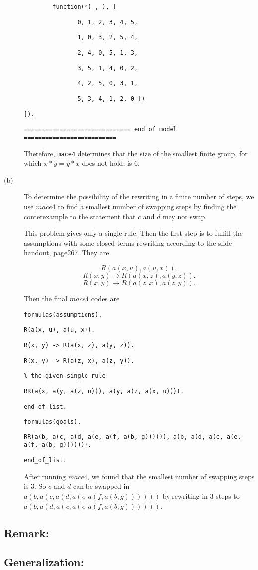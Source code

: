 \begin{description}
{\tt \ \ \ \ \ \ \ \ function(*(\_,\_), [}

{\tt \	\	\	\ \ \ \	\	\	\ \ \ \ \ \ 0, 1, 2, 3, 4, 5,}

{\tt \	\	\	\ \ \ \	\	\	\ \ \ \ \ \ 1, 0, 3, 2, 5, 4,}

{\tt \	\	\	\ \ \ \	\	\	\ \ \ \ \ \ 2, 4, 0, 5, 1, 3,}
	
{\tt \	\	\	\ \ \ \	\	\	\ \ \ \ \ \ 3, 5, 1, 4, 0, 2,}

{\tt \	\	\	\ \ \ \	\	\	\ \ \ \ \ \ 4, 2, 5, 0, 3, 1,}

{\tt \	\	\	\ \ \ \	\	\	\ \ \ \ \ \ 5, 3, 4, 1, 2, 0 ])}

{\tt ]).}

{\tt ============================== end of model ==========================}
  
\vspace{2mm}

Therefore, {\tt mace4} determines that the size of the smallest finite group, for which $ x \ast y = y \ast x $ does not hold, is 6.

  \item[(b)] To determine the possibility of the rewriting in a finite number of steps, we use $mace4$ to find a smallest number of swapping steps by finding the conterexample to the statement that $c$ and $d$ may not swap.

  This problem gives only a single rule.  Then the first step is to fulfill the assumptions with some closed terms rewriting according to the slide handout, page267. They are

      \[ R(a(x, u), a(u, x)). \]
      \[ R(x, y) \rightarrow R(a(x, z), a(y, z)). \]
      \[ R(x, y) \rightarrow R(a(z, x), a(z, y)).\]

      Then the final $mace4$ codes are

{\footnotesize

{\tt formulas(assumptions).}

{\tt R(a(x, u), a(u, x)).}

{\tt R(x, y) -> R(a(x, z), a(y, z)).}

{\tt R(x, y) -> R(a(z, x), a(z, y)).}

{\tt \% the given single rule}

{\tt RR(a(x, a(y, a(z, u))), a(y, a(z, a(x, u)))).}

{\tt end\_of\_list.}

{\tt formulas(goals).}

{\tt RR(a(b, a(c, a(d, a(e, a(f, a(b, g)))))), a(b, a(d, a(c, a(e, a(f, a(b, g))))))).}

{\tt end\_of\_list.  }

  }

  After running $mace4$, we found that the smallest number of swapping steps is 3. So $c$ and $d$ can be swapped in $a(b, a(c, a(d, a(e, a(f, a(b, g))))))$ by rewriting in 3 steps to $a(b, a(d, a(c, a(e, a(f, a(b, g))))))$.

\end{description}

\subsection*{Remark:}


\subsection*{Generalization:}




